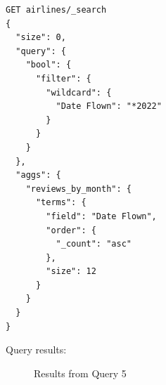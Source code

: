 \documentclass{Configuration_Files/PoliMi3i_thesis}
\begin{document}
\begin{enumerate}
    \begin{verbatim}
GET airlines/_search
{
  "size": 0,
  "query": {
    "bool": {
      "filter": {
        "wildcard": {
          "Date Flown": "*2022"
        }
      }
    }
  },
  "aggs": {
    "reviews_by_month": {
      "terms": {
        "field": "Date Flown",
        "order": {
          "_count": "asc"
        },
        "size": 12
      }
    }
  }
}
    \end{verbatim}

Query results:
\begin{figure}[H]
    \centering
    \quad
        \caption{Results from Query 5}


\end{figure}
\end{enumerate}
\end{document}
